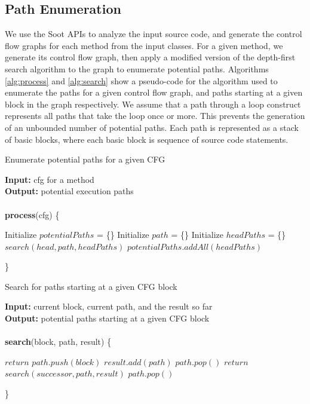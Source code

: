 \documentclass[10pt,twocolumn,letterpaper]{article}
\begin{document}
\subsection{Path Enumeration}
We use the Soot \cite{vallee1999soot} APIs to analyze the input source code, and generate the control flow graphs for each method from the input classes. For a
given method, we generate its control flow graph, then apply a modified version of the depth-first search algorithm to the graph to enumerate potential paths.
Algorithms \ref{alg:process} and \ref{alg:search} show a pseudo-code for the algorithm used to enumerate the paths for a given control flow graph, and paths
starting at a given block in the graph respectively. We assume that a path through a loop construct represents all paths that take the loop once or more. This
prevents the generation of an unbounded number of potential paths. Each path is represented as a stack of basic blocks, where each basic block is sequence of
source code statements.

\begin{algorithm}[h!]
\caption{Enumerate potential paths for a given CFG}
\label{alg:process}
\textbf{Input:} {cfg for a method} \\
\textbf{Output:} {potential execution paths} \\ \\
\textbf{process}(cfg) \{
\begin{algorithmic}
\STATE Initialize $potentialPaths$ = \{\}
     \STATE Initialize $path$ = \{\}
     \STATE Initialize $headPaths$ = \{\}
     \STATE $search(head, path, headPaths)$
     \STATE $potentialPaths.addAll(headPaths)$
    \ENDFOR
\end{algorithmic}
\}
\end{algorithm}

\begin{algorithm}[h!]
\caption{Search for paths starting at a given CFG block}
\label{alg:search}
\textbf{Input:} {current block, current path, and the result so far} \\
\textbf{Output:} {potential paths starting at a given CFG block} \\ \\
\textbf{search}(block, path, result) \{
\begin{algorithmic}
    \STATE $return$
   \ENDIF
   \STATE $path.push(block)$ 
    \STATE $result.add(path)$
    \STATE $path.pop()$ 
    \STATE $return$
   \ENDIF
    \STATE $search(successor, path, result)$
   \ENDFOR
   \STATE $path.pop()$ 
\end{algorithmic}
\}
\end{algorithm}
\end{document}
